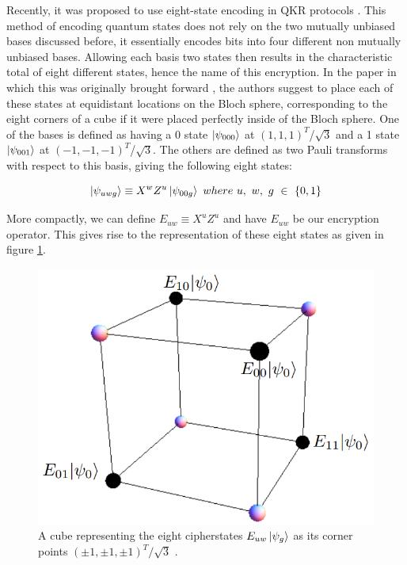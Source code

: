 \documentclass[]{article}
\begin{document}
Recently, it was proposed to use eight-state encoding in QKR protocols \cite{DeVries2016}. This method of encoding quantum states does not rely on the two mutually unbiased bases discussed before, it essentially encodes bits into four different non mutually unbiased bases. Allowing each basis two states then results in the characteristic total of eight different states, hence the name of this encryption. In the paper in which this was originally brought forward \cite{DeVries2016}, the authors suggest to place each of these states at equidistant locations on the Bloch sphere, corresponding to the eight corners of a cube if it were placed perfectly inside of the Bloch sphere. One of the bases is defined as having a 0 state $\ket{\psi_{000}}$ at $(1,1,1)^T$/$\sqrt{3}$ and a 1 state $\ket{\psi_{001}}$ at $(-1,-1,-1)^T$/$\sqrt{3}$. The others are defined as two Pauli transforms with respect to this basis, giving the following eight states:

\begin{equation}
	\label{equation:EightStatePaulis}
	\ket{\psi_{uwg}} \equiv X^w Z^u\ket{\psi_{00g}}~where~ u,~ w,~ g~ \in~ \{0,1\}
\end{equation}

More compactly, we can define $E_{uw} \equiv X^u Z^u$ and have $E_{uw}$ be our encryption operator. This gives rise to the representation of these eight states as given in figure \ref{fig:eightstatecube}.

\begin{center}
\begin{figure}
	\begin{center}
	\includegraphics[width=0.5\linewidth]{Eightstatecube.png}
	\caption{A cube representing the eight cipherstates $E_{uw}\ket{\psi_{g}}$ as its corner points $(\pm1,\pm1,\pm1)^T/\sqrt{3}$ \cite{DeVries2016}.}
	\label{fig:eightstatecube}
	\end{center}
\end{figure}
\end{center}
\end{document}
